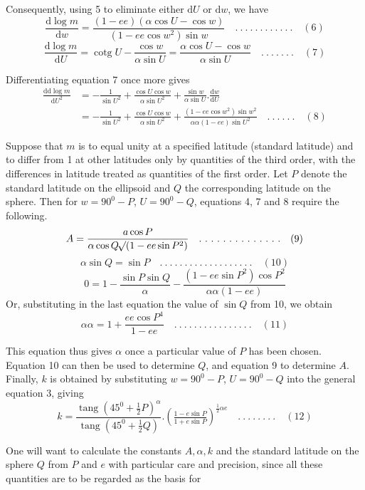 %
Consequently, using 5 to eliminate either \(\mathrm{d}U\) or \(\mathrm{d}w\), we have
\[
\frac{\mathrm{d}\log m}{\mathrm{d}w}=\frac{(1-ee)(\alpha\cos U-\cos w)}{(1-ee\cos w^2)\sin w} \quad .\ .\ .\ .\ .\ .\ .\ .\ .\ .\ .\ .\quad(6)
\]
\[
\frac{\mathrm{d}\log m}{\mathrm{d}U}=\operatorname{cotg}U-\frac{\cos w}{\alpha\sin U}=\frac{\alpha\cos U-\cos w}{\alpha\sin U} \quad .\ .\ .\ .\ .\ .\ .\quad(7)
\]

Differentiating equation 7 once more gives
\[
\begin{aligned}
\frac{\mathrm{dd}\log m}{\mathrm{d}U^2}&=-\frac{1}{\sin U^2}+\frac{\cos U\cos w}{\alpha\sin U^2}+\frac{\sin w}{\alpha\sin U}\mathord{.}\frac{\mathrm{d}w}{\mathrm{d}U}\\
&=-\frac{1}{\sin U^2}+\frac{\cos U\cos w}{\alpha\sin U^2}+\frac{(1-ee\cos w^2)\sin w^2}{\alpha\alpha(1-ee)\sin U^2} \quad .\ .\ .\ .\ .\ .\quad(8)
\end{aligned}
\]

Suppose that \(m\) is to equal unity at a specified latitude (standard latitude) and to differ from 1 at other latitudes only by quantities of the third order, with the differences in latitude treated as quantities of the first order. Let \(P\) denote the standard latitude on the ellipsoid and \(Q\) the corresponding latitude on the sphere. Then for \(w=90^0-P\), \(U=90^0-Q\), equations 4, 7 and 8 require the following.
\[
A=\frac{a\cos P}{\alpha\cos Q\mathord{{}^{}\!\surd}(1-ee\sin P^2)} \quad .\ .\ .\ .\ .\ .\ .\ .\ .\ .\ .\ .\ .\ .\quad(9)
\]
\[
\alpha\sin Q=\sin P \quad .\ .\ .\ .\ .\ .\ .\ .\ .\ .\ .\ .\ .\ .\ .\ .\ .\ .\ .\quad(10)
\]
\[
0=1-\frac{\sin P\sin Q}{\alpha}-\frac{(1-ee\sin P^2)\cos P^2}{\alpha\alpha(1-ee)}
\]
Or, substituting in the last equation the value of \(\sin Q\) from 10, we obtain
\[
\alpha\alpha=1+\frac{ee\cos P^4}{1-ee} \quad .\ .\ .\ .\ .\ .\ .\ .\ .\ .\ .\ .\ .\ .\ .\ .\quad(11)
\]

This equation thus gives \(\alpha\) once a particular value of \(P\) has been chosen. Equation 10 can then be used to determine \(Q\), and equation 9 to determine \(A\). Finally, \(k\) is obtained by substituting \(w=90^0-P\), \(U=90^0-Q\) into the general equation 3, giving
\[
k=\frac{\operatorname{tang}(45^0+\frac{1}{2}P)^\alpha}{\operatorname{tang}(45^0+\frac{1}{2}Q)}\mathord{.}(\tfrac{1-e\sin P}{1+e\sin P})^{\frac{1}{2}\alpha e} \quad .\ .\ .\ .\ .\ .\ .\ .\quad(12)
\]

\indent One will want to calculate the constants \(A,\alpha,k\) and the standard latitude on the sphere \(Q\) from \(P\) and \(e\) with particular care and precision, since all these quantities are to be regarded as the basis for
